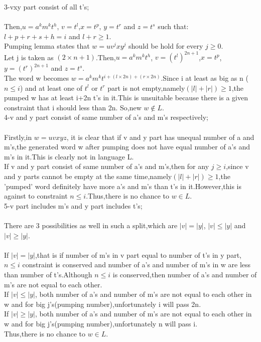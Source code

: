 \documentclass[a4paper,12pt]{article}
\begin{document}
\begin{tcolorbox}
3-vxy part consist of all t's;\\\\
Then,$u=a^km^kt^h$, $v=t^l$,$x=t^p$, $y=t^r$ and $z=t^s$ such that:\\
$l+p+r+s+h=i$ and $l+r\geq 1$.\\
Pumping lemma states that $w=uv^jxy^j$ should be hold for every $j\geq 0$.\\
Let j is taken as $(2\times n+1)$.Then,$u=a^km^kt^h$, $v={(t^l)}^{2n+1}$,$x=t^p$, $y={(t^r)}^{2n+1}$ and $z=t^s$.\\The word w becomes $w=a^km^kt^{i+(l\times 2n)+(r\times 2n)}$.Since i at least as big as n ($n\leq i$) and at least one of $t^l$ or $t^r$ part is not empty,namely$(|l|+|r|)\geq 1$,the pumped w has at least i+2n t's in it.This is unsuitable because there is a given constraint that i should less than 2n. So,new $w \notin L$.\\

4-v and y part consist of same number of a's and m's respectively;\\\\
Firstly,in $w=uvxyz$, it is clear that if v and y part has unequal number of a and m's,the generated word w after pumping does not have equal number of a's and m's in it.This is clearly not in language L.\\
If v and y part consist of same number of a's and m's,then for any $j\geq i$,since v and y parts cannot be empty at the same time,namely$(|l|+|r|)\geq 1$,the 'pumped' word definitely have more a's and m's than t's in it.However,this is against to constraint $n\leq i$.Thus,there is no chance to $w\in L$.\\

5-v part includes m's and y part includes t's;\\\\
There are 3 possibilities as well in such a split,which are $|v|=|y|$, $|v|\leq |y|$ and $|v|\geq |y|$.\\\\ 
If $|v|=|y|$,that is if number of m's in v part equal to number of t's in y part,$n\leq i$ constraint is conserved and number of a's and number of m's in w are less than number of t's.Although  $n\leq i$ is conserved,then number of a's and number of m's are not equal to each other.\\
If $|v|\leq |y|$, both number of a's and number of m's are not equal to each other in w and for big j's(pumping number),unfortunately i will pass 2n.\\
If $|v|\geq |y|$, both number of a's and number of m's are not equal to each other in w and for big j's(pumping number),unfortunately n will pass i.\\
Thus,there is no chance to $w\in L$.\\\\


\end{tcolorbox}
\end{document}
